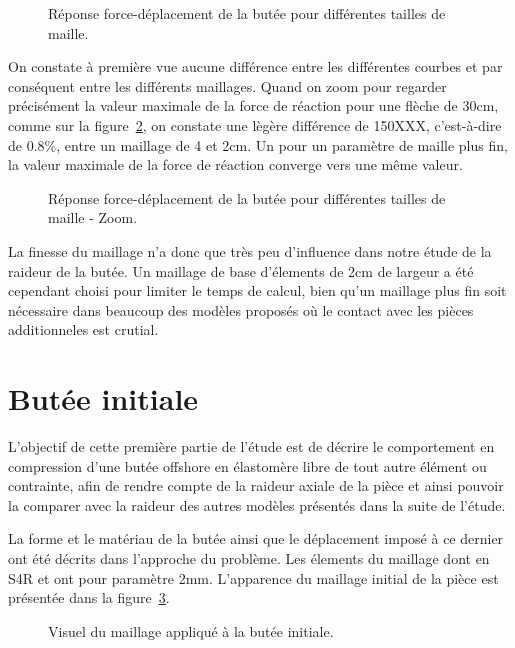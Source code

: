 ﻿ \documentclass{article}
\begin{document}
\begin{figure}[!h]
	\centering
	\caption{Réponse force-déplacement de la butée pour différentes tailles de maille.}
	\label{fig1}
\end{figure}


On constate à première vue aucune différence entre les différentes courbes et par conséquent entre les différents maillages. Quand on zoom pour regarder précisément la valeur maximale de la force de réaction pour une flèche de 30cm, comme sur la figure~\ref{fig2}, on constate une lègère différence de 150XXX, c'est-à-dire de 0.8\%, entre un maillage de 4 et 2cm. Un pour un paramètre de maille plus fin, la valeur maximale de la force de réaction converge vers une même valeur.

\begin{figure}[!h]
	\centering
	\caption{Réponse force-déplacement de la butée pour différentes tailles de maille - Zoom.}
	\label{fig2}
\end{figure}

La finesse du maillage n'a donc que très peu d'influence dans notre étude de la raideur de la butée. Un maillage de base d'élements de 2cm de largeur a été cependant choisi pour limiter le temps de calcul, bien qu'un maillage plus fin soit nécessaire dans beaucoup des modèles proposés où le contact avec les pièces additionneles est crutial.


\section{Butée initiale}

L'objectif de cette première partie de l'étude est de décrire le comportement en compression d'une butée offshore en élastomère libre de tout autre élément ou contrainte, afin de rendre compte de la raideur axiale de la pièce et ainsi pouvoir la comparer avec la raideur des autres modèles présentés dans la suite de l'étude.

La forme et le matériau de la butée ainsi que le déplacement imposé à ce dernier ont été décrits dans l'approche du problème. Les élements du maillage dont en S4R et ont pour paramètre 2mm. L'apparence du maillage initial de la pièce est présentée dans la figure~\ref{fig3}.

\begin{figure}[!h]
	\centering
	\caption{Visuel du maillage appliqué à la butée initiale.}
	\label{fig3}
\end{figure}
\end{document}

